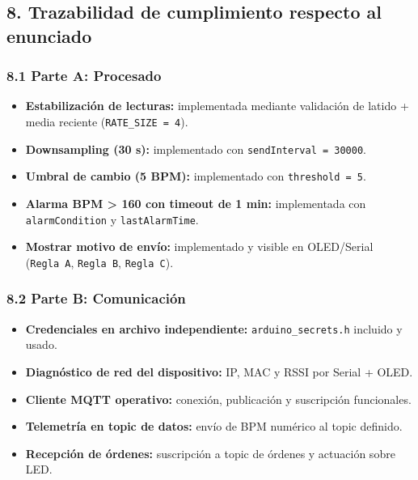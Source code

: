 \documentclass[11pt]{article}
\providecommand{\tightlist}{%
      \setlength{\itemsep}{0pt}\setlength{\parskip}{0pt}}
\begin{document}
    \subsection{8. Trazabilidad de cumplimiento respecto al
enunciado}\label{trazabilidad-de-cumplimiento-respecto-al-enunciado}

\subsubsection{8.1 Parte A: Procesado}\label{parte-a-procesado}

\begin{itemize}
\tightlist
\item
  \textbf{Estabilización de lecturas:} implementada mediante validación
  de latido + media reciente (\texttt{RATE\_SIZE\ =\ 4}).
\item
  \textbf{Downsampling (30 s):} implementado con
  \texttt{sendInterval\ =\ 30000}.
\item
  \textbf{Umbral de cambio (5 BPM):} implementado con
  \texttt{threshold\ =\ 5}.
\item
  \textbf{Alarma BPM \textgreater{} 160 con timeout de 1 min:}
  implementada con \texttt{alarmCondition} y \texttt{lastAlarmTime}.
\item
  \textbf{Mostrar motivo de envío:} implementado y visible en
  OLED/Serial (\texttt{Regla\ A}, \texttt{Regla\ B}, \texttt{Regla\ C}).
\end{itemize}

\subsubsection{8.2 Parte B: Comunicación}\label{parte-b-comunicaciuxf3n}

\begin{itemize}
\tightlist
\item
  \textbf{Credenciales en archivo independiente:}
  \texttt{arduino\_secrets.h} incluido y usado.
\item
  \textbf{Diagnóstico de red del dispositivo:} IP, MAC y RSSI por Serial
  + OLED.
\item
  \textbf{Cliente MQTT operativo:} conexión, publicación y suscripción
  funcionales.
\item
  \textbf{Telemetría en topic de datos:} envío de BPM numérico al topic
  definido.
\item
  \textbf{Recepción de órdenes:} suscripción a topic de órdenes y
  actuación sobre LED.
\end{itemize}
\end{document}
